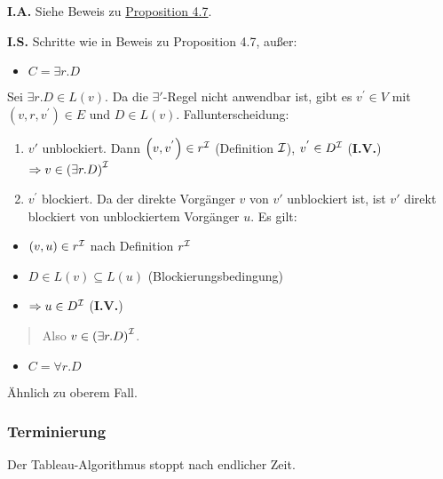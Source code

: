 \textbf{I.A.} Siehe Beweis zu
\protect\hyperlink{proposition-4.7-korrektheit}{Proposition 4.7}.

\textbf{I.S.} Schritte wie in Beweis zu Proposition 4.7, außer:

\begin{itemize}
\item
  $C = \exists r.D$
\end{itemize}

Sei $\exists r.D \in L\left( v \right)$. Da die $\exists'$-Regel
nicht anwendbar ist, gibt es $v^{'} \in V$ mit
$\left( v,r,v^{'} \right) \in E$ und $D \in L\left( v \right)$.
Fallunterscheidung:

\begin{enumerate}
\def\labelenumi{\arabic{enumi}.}
\item
  $v'$ unblockiert. Dann $\left( v,v^{'} \right) \in r^\MI$
  (Definition $\mathcal{I}$), $v^{'} \in D^{\mathcal{I}}$ (\textbf{I.V.})
  $\Rightarrow v \in \left( \exists r.D \right)^\MI$
\item
  $v^{'}$ blockiert. Da der direkte Vorgänger $v$ von $v'$
  unblockiert ist, ist $v'$ direkt blockiert von unblockiertem
  Vorgänger $u$. Es gilt:
\end{enumerate}

\begin{itemize}
\item
  $\left( v,u \right) \in r^\MI$ nach Definition $r^{\mathcal{I}}$
\item
  $D \in L\left( v \right) \subseteq L\left( u \right)$
  (Blockierungsbedingung)
\item
  $\Rightarrow u \in D^{\mathcal{I}}$ (\textbf{I.V.})
\end{itemize}

\begin{quote}
Also $v \in \left( \exists r.D \right)^\MI$.
\end{quote}

\begin{itemize}
\item
  $C = \forall r.D$
\end{itemize}

Ähnlich zu oberem Fall.

\subsubsection{Terminierung}\label{terminierung}

\begin{proposition}
Der Tableau-Algorithmus stoppt nach endlicher Zeit.
\end{proposition}


